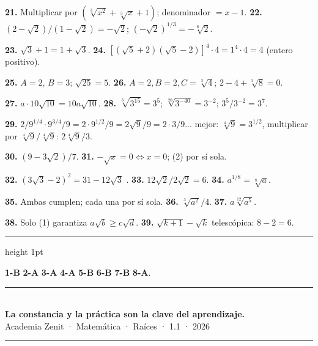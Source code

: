 \documentclass[11pt, letterpaper]{article}
\newcommand{\subbloque}[1]{%
  \vspace{14pt}
  \noindent{\large\bfseries\color{zenitnavy} #1}\par
  \vspace{4pt}\hrule height 1pt\vspace{8pt}}
\begin{document}
\textbf{21.} Multiplicar por $(\sqrt[3]{x^2}+\sqrt[3]{x}+1)$; denominador $=x-1$. \quad \textbf{22.} $(2-\sqrt{2})/(1-\sqrt{2})=-\sqrt{2}$; $(-\sqrt{2})^{1/3}=-\sqrt[6]{2}$.

\textbf{23.} $\sqrt{3}+1=1+\sqrt{3}$. \quad \textbf{24.} $[(\sqrt{5}+2)(\sqrt{5}-2)]^4\cdot4=1^4\cdot4=4$ (entero positivo).

\textbf{25.} $A=2$, $B=3$; $\sqrt{25}=5$. \quad \textbf{26.} $A=2,B=2,C=\sqrt[3]{4}$; $2-4+\sqrt[3]{8}=0$.

\textbf{27.} $a\cdot10\sqrt{10}=10a\sqrt{10}$. \quad \textbf{28.} $\sqrt[3]{3^{15}}=3^5$; $\sqrt[20]{3^{-40}}=3^{-2}$; $3^5/3^{-2}=3^7$.

\textbf{29.} $2/9^{1/4}\cdot9^{3/4}/9=2\cdot9^{1/2}/9=2\sqrt{9}/9=2\cdot3/9$... mejor: $\sqrt[4]{9}=3^{1/2}$, multiplicar por $\sqrt[4]{9}/\sqrt[4]{9}$: $2\sqrt[4]{9}/3$.

\textbf{30.} $(9-3\sqrt{2})/7$. \quad \textbf{31.} $-\sqrt{x}=0\Leftrightarrow x=0$; (2) por sí sola.

\textbf{32.} $(3\sqrt{3}-2)^2=31-12\sqrt{3}$ \checkmark{}. \quad \textbf{33.} $12\sqrt{2}/2\sqrt{2}=6$. \quad \textbf{34.} $a^{1/8}=\sqrt[8]{a}$.

\textbf{35.} Ambas cumplen; cada una por sí sola. \quad \textbf{36.} $\sqrt[3]{a^2}/4$. \quad \textbf{37.} $a\sqrt[12]{a^5}$.

\textbf{38.} Solo (1) garantiza $a\sqrt{b}\geq c\sqrt{d}$. \quad \textbf{39.} $\sqrt{k+1}-\sqrt{k}$ telescópica: $8-2=6$.

\subbloque{Alternativas}

\textbf{1-B} \quad \textbf{2-A} \quad \textbf{3-A} \quad \textbf{4-A} \quad \textbf{5-B} \quad \textbf{6-B} \quad \textbf{7-B} \quad \textbf{8-A}.

\vspace{8pt}
\begin{center}
  \rule{\linewidth}{1.5pt}\\[4pt]
  {\large\bfseries\color{zenitnavy} La constancia y la práctica son la clave del aprendizaje.}\\[2pt]
  {\color{zenitgold}\small Academia Zenit · Matemática · Raíces · 1.1 · 2026}
  \rule{\linewidth}{1.5pt}
\end{center}
\end{document}

